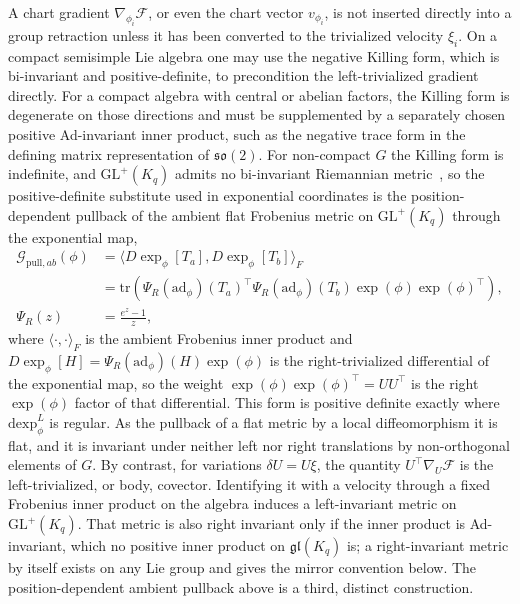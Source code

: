 \documentclass[11pt]{article}
\begin{document}
A chart gradient $\nabla_{\phi_i}\mathcal{F}$, or even the chart vector $v_{\phi_i}$, is not inserted directly into a group retraction unless it has been converted to the trivialized velocity $\xi_i$. On a compact semisimple Lie algebra one may use the negative Killing form, which is bi-invariant and positive-definite, to precondition the left-trivialized gradient directly. For a compact algebra with central or abelian factors, the Killing form is degenerate on those directions and must be supplemented by a separately chosen positive Ad-invariant inner product, such as the negative trace form in the defining matrix representation of $\mathfrak{so}(2)$. For non-compact $G$ the Killing form is indefinite, and $\mathrm{GL}^+(K_q)$ admits no bi-invariant Riemannian metric~\cite[Lemma~7.5]{Milnor1976}, so the positive-definite substitute used in exponential coordinates is the position-dependent pullback of the ambient flat Frobenius metric on $\mathrm{GL}^+(K_q)$ through the exponential map,
\begin{equation}
\begin{aligned}
\mathcal{G}_{\mathrm{pull},ab}(\phi)
&= \langle D\exp_\phi[T_a], D\exp_\phi[T_b] \rangle_F \\
&= \mathrm{tr}\left(
\Psi_R(\mathrm{ad}_\phi)(T_a)^\top
\Psi_R(\mathrm{ad}_\phi)(T_b)
\exp(\phi)\exp(\phi)^\top
\right), \\
\Psi_R(z) &= \frac{e^{z} - 1}{z},
\end{aligned}
\label{eq:pullback_metric}
\end{equation}
where $\langle\cdot,\cdot\rangle_F$ is the ambient Frobenius inner product and $D\exp_\phi[H] = \Psi_R(\mathrm{ad}_\phi)(H)\exp(\phi)$ is the right-trivialized differential of the exponential map, so the weight $\exp(\phi)\exp(\phi)^\top = UU^\top$ is the right $\exp(\phi)$ factor of that differential. This form is positive definite exactly where $\mathrm{dexp}^{L}_\phi$ is regular. As the pullback of a flat metric by a local diffeomorphism it is flat, and it is invariant under neither left nor right translations by non-orthogonal elements of $G$. By contrast, for variations $\delta U=U\xi$, the quantity $U^\top\nabla_U\mathcal{F}$ is the left-trivialized, or body, covector. Identifying it with a velocity through a fixed Frobenius inner product on the algebra induces a left-invariant metric on $\mathrm{GL}^+(K_q)$. That metric is also right invariant only if the inner product is Ad-invariant, which no positive inner product on $\mathfrak{gl}(K_q)$ is; a right-invariant metric by itself exists on any Lie group and gives the mirror convention below. The position-dependent ambient pullback above is a third, distinct construction.
\end{document}
